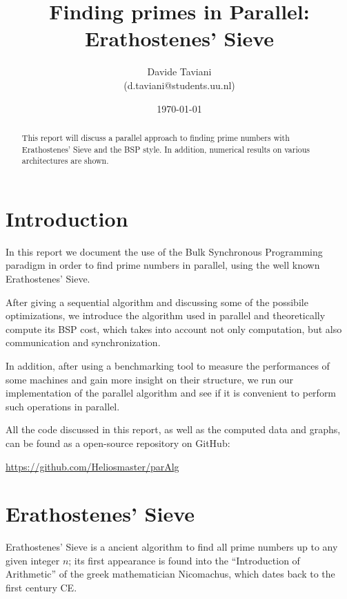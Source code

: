 \documentclass[a4paper,11pt]{article}
\begin{document}
\title{Finding primes in Parallel: Erathostenes' Sieve}
\author{Davide Taviani\\
(d.taviani@students.uu.nl)}
\date{\today}

\maketitle

\begin{abstract}
This report will discuss a parallel approach to finding prime numbers with Erathostenes' Sieve and the BSP style. In addition, numerical results on various architectures are shown.
\end{abstract}

\tableofcontents

\pagebreak

\section{Introduction}

In this report we document the use of the Bulk Synchronous Programming paradigm \citep{parsc} in order to find prime numbers in parallel, using the well known Erathostenes' Sieve.

After giving a sequential algorithm and discussing some of the possibile optimizations, we introduce the algorithm used in parallel and theoretically compute its BSP cost, which takes into account not only computation, but also communication and synchronization.

In addition, after using a benchmarking tool to measure the performances of some machines and gain more insight on their structure, we run our implementation of the parallel algorithm and see if it is convenient to perform such operations in parallel.

All the code discussed in this report, as well as the computed data and graphs, can be found as a open-source repository on GitHub:

\url{https://github.com/Heliosmaster/parAlg}

\section{Erathostenes' Sieve}

Erathostenes' Sieve is a ancient algorithm to find all prime numbers up to any given integer $n$; its first appearance is found into the  ``Introduction of Arithmetic'' of the greek mathematician Nicomachus, which dates back to the first century CE.
\end{document}
